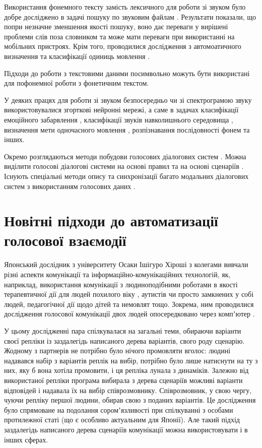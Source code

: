 Використання фонемного тексту замість лексичного для роботи зі звуком було добре досліджено в задачі пошуку по звуковим файлам \cite{Ng_C_2000,Ng_K_2000,Witbrock_1997}. Результати показали, що попри незначне зменшення якості пошуку, воно дає переваги у вирішені проблеми слів поза словником та може мати переваги при використанні на мобільних пристроях. Крім того, проводилися дослідження з автомоатичного визначення та класифікації одиниць мовлення \cite{Sharma_2018}.

Підходи до роботи з текстовими даними посимвольно \cite{Kim_2016,Zhang_2015_2,Zhang_2015,Santos_2014} можуть бути використані для пофонемної роботи з фонетичним текстом.

У деяких працях для роботи зі звуком безпосередньо чи зі спектрограмою звуку використовувалися згорткові нейронні мережі, а саме в задачах класифікації емоційного забарвлення \cite{Weisskirchen_2017}, класифікації звуків навколишнього середовища \cite{Boddapati_2017}, визначення мети одночасного мовлення \cite{Chowdhury_2018}, розпізнавання послідовності фонем \cite{Abdel_2012,Zhang_2017} та інших.

Окремо розглядаються методи побудови голосових діалогових систем \cite{Iosif_2018}. Можна виділити голосові діалогові системи на основі правил \cite{Herbert_2018,Lopes_2015} та на основі сценаріїв \cite{Lopez_2016,Khouzaimi_2018}. Існують спеціальні методи опису та синхронізації багато модальних діалогових систем з використанням голосових даних \cite{Katsurada_2003,Karpov_2012}. 

\section{Новітні підходи до автоматизації голосової взаємодії} \label{sect1_5}

Японський дослідник з університету Осаки Ішігуро Хіроші з колегами вивчали різні аспекти комунікації та інформаційно-комунікаційних технологій, як, наприклад, використання комунікації з людиноподібними роботами в якості терапевтичної дії для людей похилого віку \cite{Nishio_2015}, аутистів \cite{Kumazaki_2016} чи просто замкнених у собі людей, педагогічної дії щодо дітей та немовлят \cite{Park_2015} тощо. Зокрема, ним проводилися дослідження голосової комунікації двох людей опосередковано через компʼютер \cite{Ishiguro_2016}.

У цьому дослідженні пара спілкувалася на загальні теми, обираючи варіанти своєї репліки із заздалегідь написаного дерева варіантів, свого роду сценарію. Жодному з партнерів не потрібно було нічого промовляти вголос: людині надавався набір з варіантів реплік на вибір, потрібно було лише натиснути на ту з них, яку б вона хотіла  промовити, і ця репліка лунала з динаміків. Залежно від використаної репліки програма вибирала з дерева сценаріїв можливі варіанти відповідей і надавала їх на вибір співрозмовнику. Співрозмовник, у свою чергу, чуючи репліку першої людини, обирав свою з поданих варіантів. Це дослідження було спрямоване на подолання соромʼязливості при спілкуванні з особами протилежної статі (що є особливо актуальним для Японії). Але такий підхід заздалегідь написаного дерева сценаріїв комунікації можна використовувати і в інших сферах.

